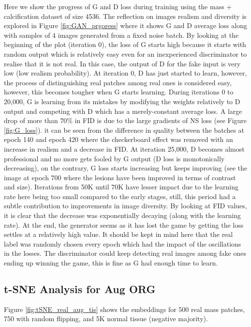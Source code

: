 \documentclass[final,3p,twocolumn,authoryear,sort&compress,times]{maia}
\begin{document}
Here we show the progress of G and D loss during training using the mass + calcification dataset of size 4536. The reflection on images realism and diversity is explored in Figure \ref{fig:GAN_prgoress} where it shows G and D average loss along with samples of 4 images generated from a fixed noise batch. By looking at the beginning of the plot (iteration 0), the loss of G starts high because it starts with random output which is relatively easy even for an inexperienced discriminator to realise that it is not real. In this case, the output of D for the fake input is very low (low realism probability). At iteration 0, D has just started to learn, however, the process of distinguishing real patches among real ones is considered easy, however, this becomes tougher when G starts learning. During iterations 0 to 20,000, G is learning from its mistakes by modifying the weights relatively to D output and competing with D which has a merely-constant average loss. A large drop of more than $70\%$ in FID is due to the large gradients of NS loss (see Figure \ref{fig:G_loss}). it can be seen from the difference in quality between the batches at epoch 140 and epoch 420 where the checkerboard effect was removed with an increase in realism and a decrease in FID. At iteration 25,000, D becomes almost professional and no more gets fooled by G output (D loss is monotonically decreasing), on the contrary, G loss starts increasing but keeps improving (see the image at epoch 700 where the lesions have been improved in terms of contrast and size). Iterations from 50K until 70K have lesser impact due to the learning rate here being too small compared to the early stages, still, this period had a subtle contribution to improvements in image diversity. By looking at FID values, it is clear that the decrease was exponentially decaying (along with the learning rate). At the end, the generator seems as it has lost the game by getting the loss settles at a relatively high value. It should be kept in mind here that the real label was randomly chosen every epoch which had the impact of the oscillations in the losses. The discriminator could keep detecting real images among fake ones ending up winning the game, this is fine as G had enough time to learn.

\subsection{t-SNE Analysis for Aug ORG}
\label{annex:t_SNE_real_aug_tis}

Figure \ref{fig:tSNE_real_aug_tis} shows the embeddings for 500 real mass patches, 750 with random flipping, and 5K normal tissue (negative majority).
\end{document}
